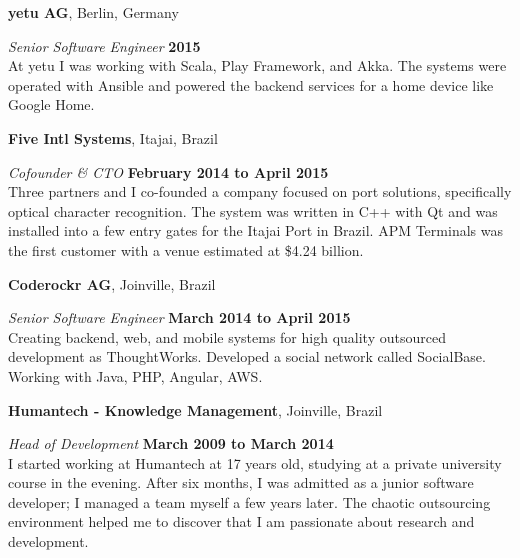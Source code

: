 \documentclass[12pt]{article}
\newcommand{\halfblankline}{\quad\vspace{-0.5\baselineskip}\pagebreak[3]}
\begin{document}
\halfblankline

\textbf{yetu AG},
Berlin, Germany
\begin{outerlist}

    \item[] \textit{Senior Software Engineer}%
            \hfill \textbf{2015}\\
            At yetu I was working with Scala, Play Framework, and Akka. The systems were operated with Ansible and powered the backend services for a home device like Google Home.

\end{outerlist}

\halfblankline

\textbf{Five Intl Systems},
Itajai, Brazil
\begin{outerlist}

    \item[] \textit{Cofounder \& CTO}%
            \hfill \textbf{February 2014 to April 2015}\\
            Three partners and I co-founded a company focused on port solutions, specifically optical character recognition. The system was written in C++ with Qt and was installed into a few entry gates for the Itajai Port in Brazil. APM Terminals was the first customer with a venue estimated at \$4.24 billion.
            
\end{outerlist}

\halfblankline

\textbf{Coderockr AG},
Joinville, Brazil
\begin{outerlist}

    \item[] \textit{Senior Software Engineer}%
            \hfill \textbf{March 2014 to April 2015}\\
            Creating backend, web, and mobile systems for high quality outsourced development as ThoughtWorks. Developed a social network called SocialBase. Working with Java, PHP, Angular, AWS.
            
\end{outerlist}

\halfblankline

\textbf{Humantech - Knowledge Management},
Joinville, Brazil
\begin{outerlist}

    \item[] \textit{Head of Development}%
            \hfill \textbf{March 2009 to March 2014}\\
            I started working at Humantech at 17 years old, studying at a private university course in the evening. After six months, I was admitted as a junior software developer; I managed a team myself a few years later. The chaotic outsourcing environment helped me to discover that I am passionate about research and development.

\end{outerlist}
\end{document}

